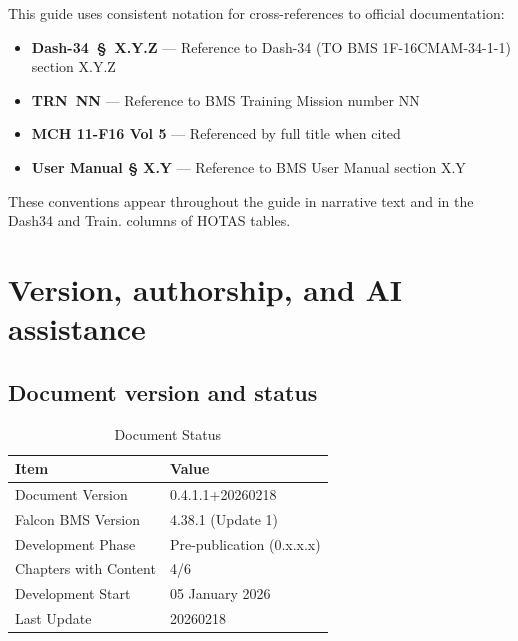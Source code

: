 \documentclass[11pt, a4paper, twoside]{report}
\newcommand{\docversion}{0.4.1.1}
\newcommand{\docbuild}{20260218}
\newcommand{\docstartdate}{05 January 2026}
\newcommand{\docenddate}{20260218}
\newcommand{\chapterscompletedof}{4/6}
\newcommand{\fulldocversion}{\docversion+\docbuild}
\newcommand{\dashref}[1]{Dash-34~\S~#1}
\newcommand{\trnref}[1]{TRN~#1}
\begin{document}
This guide uses consistent notation for cross-references to official documentation:
\begin{itemize}
	\item \textbf{\dashref{X.Y.Z}} --- Reference to Dash-34 (TO BMS 1F-16CMAM-34-1-1) section X.Y.Z
	\item \textbf{\trnref{NN}} --- Reference to BMS Training Mission number NN
	\item \textbf{MCH 11-F16 Vol 5} --- Referenced by full title when cited
	\item \textbf{User Manual § X.Y} --- Reference to BMS User Manual section X.Y
\end{itemize}
These conventions appear throughout the guide in narrative text and in the Dash34 and Train. columns of HOTAS tables.

\section{Version, authorship, and AI assistance}
\label{sec:C1-S4}

\subsection{Document version and status}
\label{sec:C1-S4-S1}

\begin{table}[H]
	\centering
	\caption{Document Status}
	\label{tab:C1-doc-status}
	\small
	\renewcommand{\arraystretch}{1.25}
	\begin{tabular}{L{4.5cm} L{9.0cm}}
		\toprule
		\textbf{Item} & \textbf{Value} \\
		\midrule
		Document Version & \fulldocversion \\
		Falcon BMS Version & 4.38.1 (Update 1) \\
		Development Phase & Pre-publication (0.x.x.x) \\
		Chapters with Content & \chapterscompletedof \\
		Development Start & \docstartdate \\
		Last Update & \docenddate \\
		\bottomrule
	\end{tabular}
\end{table}
\end{document}
